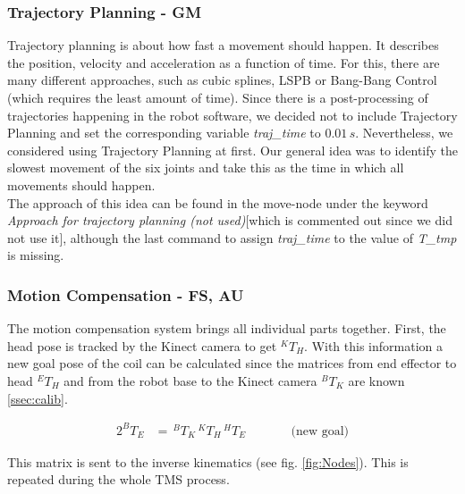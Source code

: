 \documentclass[conference]{IEEEtran}
\begin{document}
\subsubsection{Trajectory Planning - GM}
Trajectory planning is about how fast a movement should happen. It describes the position, velocity and acceleration as a function of time. For this, there are many different approaches, such as cubic splines, LSPB or Bang-Bang Control (which requires the least amount of time).
Since there is a post-processing of trajectories happening in the robot software, we decided not to include Trajectory Planning and set the corresponding variable \textit{traj\_time} to $0.01\,s$.
Nevertheless, we considered using Trajectory Planning at first. Our general idea was to identify the slowest movement of the six joints and take this as the time in which all movements should happen.\\
The approach of this idea can be found in the move-node under the keyword \textit{Approach for trajectory planning (not used)}[which is commented out since we did not use it], although the last command to assign \textit{traj\_time} to the value of \textit{T\_tmp} is missing.
\subsubsection{Motion Compensation - FS, AU}
The motion compensation system brings all individual parts together. First, the head pose is tracked by the Kinect camera to get \(^KT_H\). With this information a new goal pose of the coil can be calculated since the matrices from end effector to head \(^ET_H\) and from the robot base to the Kinect camera \(^BT_K\) are known \ref{ssec:calib}. 

\begin{alignat}{2}
    ^BT_E &=\,^BT_K \, ^KT_H \, ^HT_E &\qquad &\text{(new goal)}
\end{alignat}

This matrix is sent to the inverse kinematics (see fig. \ref{fig:Nodes}). This is repeated during the whole TMS process. 
\end{document}
